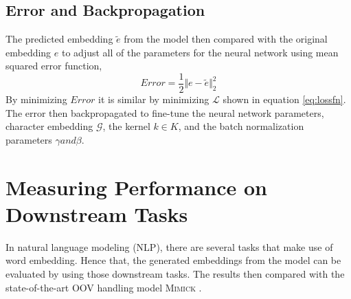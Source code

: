     \subsection{Error and Backpropagation}
        The predicted embedding $\tilde{e}$ from the model then
        compared with the original embedding $e$ to adjust all of the
        parameters for the neural network using mean squared error
        function,
        \begin{equation}
            \label{eq:errorf}
            Error = \frac{1}{2} \Vert e - \tilde{e} \Vert ^{2}_2
        \end{equation}
        By minimizing $Error$ it is similar by minimizing
        $\mathcal{L}$ shown in equation \ref{eq:lossfn}. The error
        then backpropagated to fine-tune the neural network
        parameters, character embedding $\mathcal{G}$, the kernel $k
        \in K$, and the batch normalization parameters $\gamma and
        \beta$.
        
\section{Measuring Performance on Downstream Tasks}
    In natural language modeling (NLP), there are several tasks that
    make use of word embedding. Hence that, the generated embeddings
    from the model can be evaluated by using those downstream tasks.
    The results then compared with the state-of-the-art OOV handling
    model \textsc{Mimick} \citep{mimicking2017Pinter}.
    
